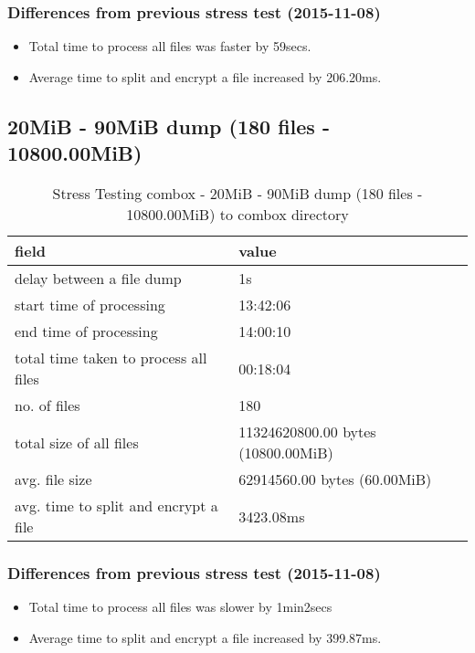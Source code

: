 \subsubsection{Differences from previous stress test (2015-11-08)}

\begin{itemize}
\item Total time to process all files was faster by 59secs.
\item Average time to split and encrypt a file increased by
  206.20ms.
\end{itemize}

\subsection{20MiB - 90MiB dump (180 files - 10800.00MiB)}\label{4-st-10800}

\begin{center}
\begin{table}[h]
\begin{tabular}{ll}
field & value\\
\hline
delay between a file dump & 1s\\
start time of processing & 13:42:06\\
end time of processing & 14:00:10\\
total time taken to process all files & 00:18:04\\
no. of files & 180\\
total size of all files & 11324620800.00 bytes (10800.00MiB)\\
avg. file size & 62914560.00 bytes (60.00MiB)\\
avg. time to split and encrypt a file & 3423.08ms\\
\end{tabular}
\caption{Stress Testing combox - 20MiB - 90MiB dump (180 files - 10800.00MiB) to combox directory}
\end{table}
\end{center}

\subsubsection{Differences from previous stress test (2015-11-08)}

\begin{itemize}
\item Total time to process all files was slower by 1min2secs
\item Average time to split and encrypt a file increased by
  399.87ms.
\end{itemize}

